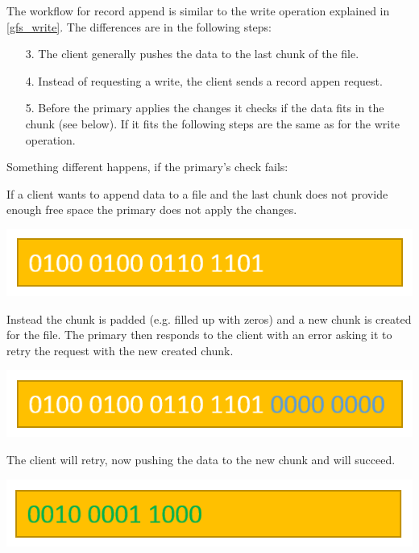 \documentclass{sig-alternate}
\begin{document}
The workflow for record append is similar to the write operation explained in \ref{gfs_write}. The differences are in the following steps:

\begin{enumerate}
\item[3.]
The client generally pushes the data to the last chunk of the file.

\item[4.]
Instead of requesting a write, the client sends a record appen request.

\item[5.]
Before the primary applies the changes it checks if the data fits in the chunk (see below). If it fits the following steps are the same as for the write operation.
\end{enumerate}

Something different happens, if the primary's check fails:

If a client wants to append data to a file and the last chunk does not provide enough free space the primary does not apply the changes.

\includegraphics[width=\linewidth]{gfs_pics/writeappend_1.png}

Instead the chunk is padded (e.g. filled up with zeros) and a new chunk is created for the file. The primary then responds to the client with an error asking it to retry the request with the new created chunk.

\includegraphics[width=\linewidth]{gfs_pics/writeappend_2.png}

The client will retry, now pushing the data to the new chunk and will succeed.

\includegraphics[width=\linewidth]{gfs_pics/writeappend_3.png}
\end{document}
